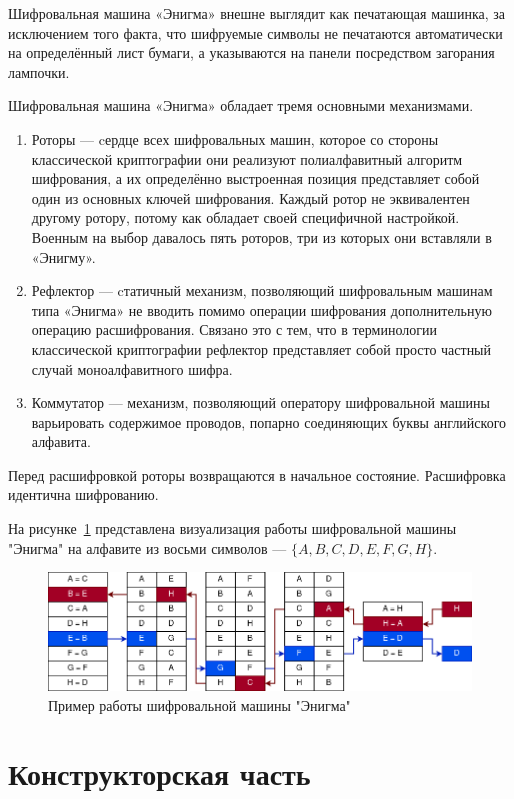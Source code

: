 Шифровальная машина «Энигма» внешне выглядит как печатающая машинка, за исключением того факта, что шифруемые символы не печатаются автоматически на определённый лист бумаги, а указываются на панели посредством загорания лампочки.

Шифровальная машина «Энигма» обладает тремя основными механизмами.
\begin{enumerate}
	\item Роторы --- cердце всех шифровальных машин, которое со стороны классической криптографии они реализуют полиалфавитный алгоритм шифрования, а их определённо выстроенная позиция представляет собой один из основных ключей шифрования. 
	Каждый ротор не эквивалентен другому ротору, потому как обладает своей специфичной настройкой. Военным на выбор давалось пять роторов, три из которых они вставляли в «Энигму».
	\item Рефлектор --- cтатичный механизм, позволяющий шифровальным машинам типа «Энигма» не вводить помимо операции шифрования дополнительную операцию расшифрования. Связано это с тем, что в терминологии классической криптографии рефлектор представляет собой просто частный случай моноалфавитного шифра.
	\item Коммутатор --- механизм, позволяющий оператору шифровальной машины варьировать содержимое проводов, попарно соединяющих буквы английского алфавита.
\end{enumerate}

Перед расшифровкой роторы возвращаются в начальное состояние. Расшифровка идентична шифрованию.

На рисунке~\ref{fig:enigma_example} представлена визуализация работы шифровальной машины "Энигма" на алфавите из восьми символов --- $\{A, B, C, D, E, F, G, H\}$.

\begin{figure}[h]
    \centering
    \includegraphics[width=1\linewidth]{images/example.png}
    \caption{Пример работы шифровальной машины "Энигма"}
    \label{fig:enigma_example}
\end{figure}



\chapter{Конструкторская часть}

